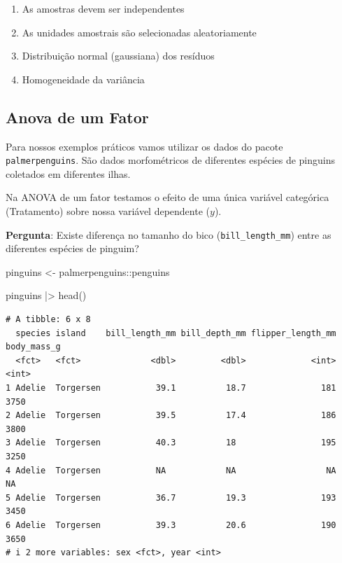 \documentclass[
  letterpaper,
  DIV=11,
  numbers=noendperiod,
  oneside]{scrartcl}
\newenvironment{Shaded}{\begin{snugshade}}{\end{snugshade}}
\newcommand{\FunctionTok}[1]{\textcolor[rgb]{0.28,0.35,0.67}{#1}}
\newcommand{\NormalTok}[1]{\textcolor[rgb]{0.00,0.23,0.31}{#1}}
\newcommand{\OtherTok}[1]{\textcolor[rgb]{0.00,0.23,0.31}{#1}}
\newcommand{\SpecialCharTok}[1]{\textcolor[rgb]{0.37,0.37,0.37}{#1}}
\providecommand{\tightlist}{%
  \setlength{\itemsep}{0pt}\setlength{\parskip}{0pt}}
\begin{document}
\begin{enumerate}
\def\labelenumi{\arabic{enumi}.}
\tightlist
\item
  As amostras devem ser independentes
\item
  As unidades amostrais são selecionadas aleatoriamente
\item
  Distribuição normal (gaussiana) dos resíduos
\item
  Homogeneidade da variância
\end{enumerate}

\subsection{Anova de um Fator}\label{anova-de-um-fator}

Para nossos exemplos práticos vamos utilizar os dados do pacote
\texttt{palmerpenguins}. São dados morfométricos de diferentes espécies
de pinguins coletados em diferentes ilhas.

Na ANOVA de um fator testamos o efeito de uma única variável categórica
(Tratamento) sobre nossa variável dependente (\(y\)).

\textbf{Pergunta}: Existe diferença no tamanho do bico
(\texttt{bill\_length\_mm}) entre as diferentes espécies de pinguim?

\begin{Shaded}
\begin{Highlighting}[]
\NormalTok{pinguins }\OtherTok{\textless{}{-}}\NormalTok{ palmerpenguins}\SpecialCharTok{::}\NormalTok{penguins}

\NormalTok{pinguins }\SpecialCharTok{|\textgreater{}}
  \FunctionTok{head}\NormalTok{()}
\end{Highlighting}
\end{Shaded}

\begin{verbatim}
# A tibble: 6 x 8
  species island    bill_length_mm bill_depth_mm flipper_length_mm body_mass_g
  <fct>   <fct>              <dbl>         <dbl>             <int>       <int>
1 Adelie  Torgersen           39.1          18.7               181        3750
2 Adelie  Torgersen           39.5          17.4               186        3800
3 Adelie  Torgersen           40.3          18                 195        3250
4 Adelie  Torgersen           NA            NA                  NA          NA
5 Adelie  Torgersen           36.7          19.3               193        3450
6 Adelie  Torgersen           39.3          20.6               190        3650
# i 2 more variables: sex <fct>, year <int>
\end{verbatim}
\end{document}
